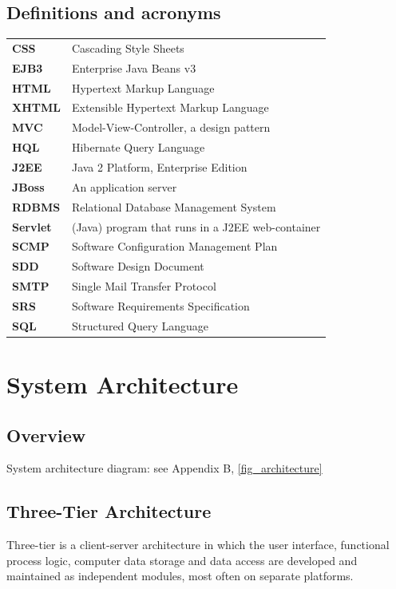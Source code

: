 \documentclass[salesmen, twoside]{../../../templates/latex/2009/softproj}
\begin{document}
\begin{projdoc}
\section{Definitions and acronyms \label{acronyms}}
\begin{tabular}{ll}
\textbf{CSS}   & Cascading Style Sheets \\
\textbf{EJB3}   & Enterprise Java Beans v3 \\
\textbf{HTML}   & Hypertext Markup Language \\
\textbf{XHTML}   & Extensible Hypertext Markup Language \\
\textbf{MVC}   & Model-View-Controller, a design pattern \\
\textbf{HQL}   & Hibernate Query Language \\
\textbf{J2EE}   & Java 2 Platform, Enterprise Edition \\
\textbf{JBoss}   & An application server \\
\textbf{RDBMS}    & Relational Database Management System \\
\textbf{Servlet}   & (Java) program that runs in a J2EE web-container  \\
\textbf{SCMP}   & Software Configuration Management Plan \\
\textbf{SDD}    & Software Design Document \\
\textbf{SMTP}   & Single Mail Transfer Protocol \\
\textbf{SRS}    & Software Requirements Specification \\
\textbf{SQL}   & Structured Query Language \\
\end{tabular}

\chapter{System Architecture}
\section{Overview}
System architecture diagram: see Appendix B, \ref{fig_architecture}

\section{Three-Tier Architecture}
Three-tier is a client-server architecture in which the user interface, functional process logic, computer data storage and data access are developed and maintained as independent modules, most often on separate platforms.


\end{projdoc}
\end{document}
